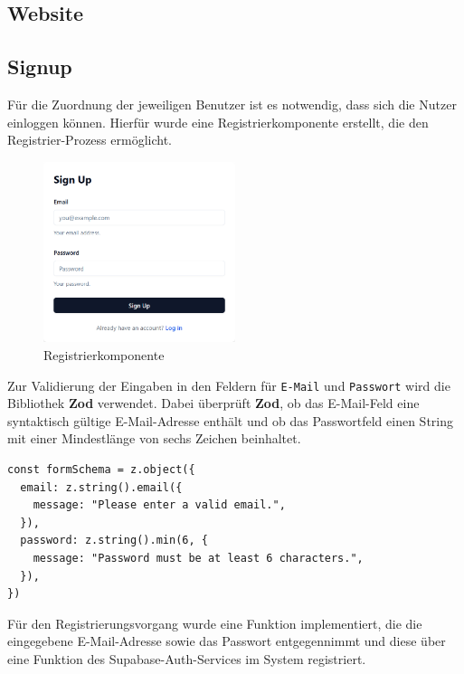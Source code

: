 \begin{inhalt}
\renewcommand*\chapterpagestyle{scrheadings}
\chapter{Website}


\section{Signup}
\label{ref:Signup}
Für die Zuordnung der jeweiligen Benutzer ist es notwendig, dass sich die Nutzer einloggen können.  
Hierfür wurde eine Registrierkomponente erstellt, die den Registrier-Prozess ermöglicht.


\begin{figure}[!htb]
\centering
\includegraphics[width=0.5\textwidth]{files/Thomas/pics/Website/Signup/sign-up.png}
\caption[Bildbezeichnung für Abbildungsverzeichnis]{Registrierkomponente}
\label{fig:gehaeuse_internet_bild}
\end{figure}

Zur Validierung der Eingaben in den Feldern für \texttt{E-Mail} und \texttt{Passwort} wird die Bibliothek \textbf{Zod} verwendet. Dabei überprüft \textbf{Zod}, ob das E-Mail-Feld eine syntaktisch gültige E-Mail-Adresse enthält und ob das Passwortfeld einen String mit einer Mindestlänge von sechs Zeichen beinhaltet.


\begin{lstlisting}[style=mytsx]
const formSchema = z.object({
  email: z.string().email({
    message: "Please enter a valid email.",
  }),
  password: z.string().min(6, {
    message: "Password must be at least 6 characters.",
  }),
})
\end{lstlisting}

\newpage

Für den Registrierungsvorgang wurde eine Funktion implementiert, die die eingegebene E-Mail-Adresse sowie das Passwort entgegennimmt und diese über eine Funktion des Supabase-Auth-Services im System registriert.



\end{inhalt}
